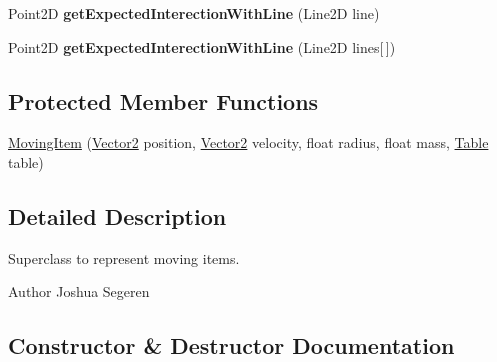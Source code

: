 \begin{DoxyCompactItemize}
\item 
\hypertarget{classairhockeyjava_1_1physical_1_1_moving_item_a3fd9036f86a87882268964488b72dd23}{}Point2\+D {\bfseries get\+Expected\+Interection\+With\+Line} (Line2\+D line)\label{classairhockeyjava_1_1physical_1_1_moving_item_a3fd9036f86a87882268964488b72dd23}

\item 
\hypertarget{classairhockeyjava_1_1physical_1_1_moving_item_acf7f7ae95a32c87571e9948a7b8160db}{}Point2\+D {\bfseries get\+Expected\+Interection\+With\+Line} (Line2\+D lines\mbox{[}$\,$\mbox{]})\label{classairhockeyjava_1_1physical_1_1_moving_item_acf7f7ae95a32c87571e9948a7b8160db}

\end{DoxyCompactItemize}
\subsection*{Protected Member Functions}
\begin{DoxyCompactItemize}
\item 
\hyperlink{classairhockeyjava_1_1physical_1_1_moving_item_ad4ecbbfa25ca35d26199a764c516ac50}{Moving\+Item} (\hyperlink{classairhockeyjava_1_1util_1_1_vector2}{Vector2} position, \hyperlink{classairhockeyjava_1_1util_1_1_vector2}{Vector2} velocity, float radius, float mass, \hyperlink{classairhockeyjava_1_1physical_1_1_table}{Table} table)
\end{DoxyCompactItemize}


\subsection{Detailed Description}
Superclass to represent moving items. \begin{DoxyAuthor}{Author}
Joshua Segeren 
\end{DoxyAuthor}


\subsection{Constructor \& Destructor Documentation}
\hypertarget{classairhockeyjava_1_1physical_1_1_moving_item_ad4ecbbfa25ca35d26199a764c516ac50}{}
